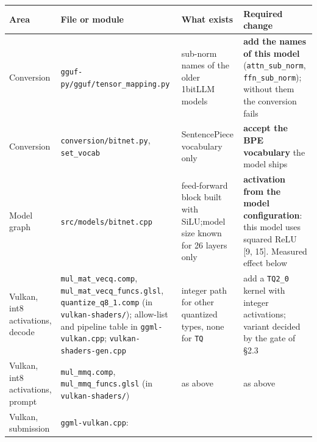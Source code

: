 \documentclass[
  10pt,
]{article}
\newcounter{none} %
\begin{document}
{\def\LTcaptype{none} %
\begin{longtable}[]{@{}
  >{\raggedright\arraybackslash}p{}
  >{\raggedright\arraybackslash}p{}
  >{\raggedright\arraybackslash}p{}
  >{\raggedright\arraybackslash}p{}@{}}
\toprule\noalign{}
\begin{minipage}[b]{\linewidth}\raggedright%
Area
\end{minipage} & \begin{minipage}[b]{\linewidth}\raggedright%
File or module
\end{minipage} & \begin{minipage}[b]{\linewidth}\raggedright%
What exists
\end{minipage} & \begin{minipage}[b]{\linewidth}\raggedright%
Required change
\end{minipage} \\
\midrule\noalign{}
\endhead%
\bottomrule\noalign{}
\endlastfoot%
Conversion & \texttt{gguf-py/gguf/\allowbreak{}tensor\_mapping.py} & sub-norm names
of the older 1bitLLM models & \textbf{add the names of this model}
(\texttt{attn\_sub\_norm}, \texttt{ffn\_sub\_norm}); without them the
conversion fails \\
Conversion & \texttt{conversion/bitnet.py}, \texttt{set\_vocab} &
SentencePiece vocabulary only & \textbf{accept the BPE vocabulary} the
model ships \\
Model graph & \texttt{src/models/bitnet.cpp} & feed-forward block built
with SiLU;\@ model size known for 26 layers only & \textbf{activation from
the model configuration}: this model uses squared ReLU [9, 15].
Measured effect below \\
Vulkan, int8 activations, decode & \texttt{mul\_mat\_vecq.comp},
\texttt{mul\_mat\_vecq\_funcs.glsl}, \texttt{quantize\_q8\_1.comp} (in
\texttt{vulkan-shaders/}); allow-list and pipeline table in
\texttt{ggml-vulkan.cpp}; \texttt{vulkan-shaders-gen.cpp} & integer path
for other quantized types, none for \texttt{TQ} & add a \texttt{TQ2\_0}
kernel with integer activations; variant decided by the gate of \S{}2.3 \\
Vulkan, int8 activations, prompt & \texttt{mul\_mmq.comp},
\texttt{mul\_mmq\_funcs.glsl} (in \texttt{vulkan-shaders/}) & as above &
as above \\
Vulkan, submission & \texttt{ggml-vulkan.cpp}:

\end{longtable}}
\end{document}
